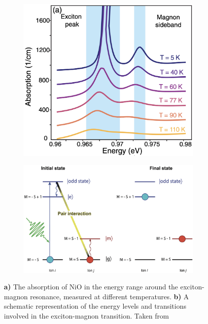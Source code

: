\begin{figure}[ht]
    \centering
    \begin{subfigure}[b]{0.3\textwidth}
        \includegraphics[width=\textwidth]{pictures/5.png}
        \caption{}
        \label{fig:5}
    \end{subfigure}
    \hspace{1cm}
    \begin{subfigure}[b]{0.6\textwidth}
        \includegraphics[width=\textwidth]{pictures/6.png}
        \caption{}
        \label{fig:6}
    \end{subfigure}
    \caption{\textbf{a)} The absorption of NiO in the energy range around the exciton-magnon resonance, measured at different temperatures. \textbf{b)} A schematic representation of the energy levels and transitions involved in the exciton-magnon transition. Taken from }
\end{figure}

